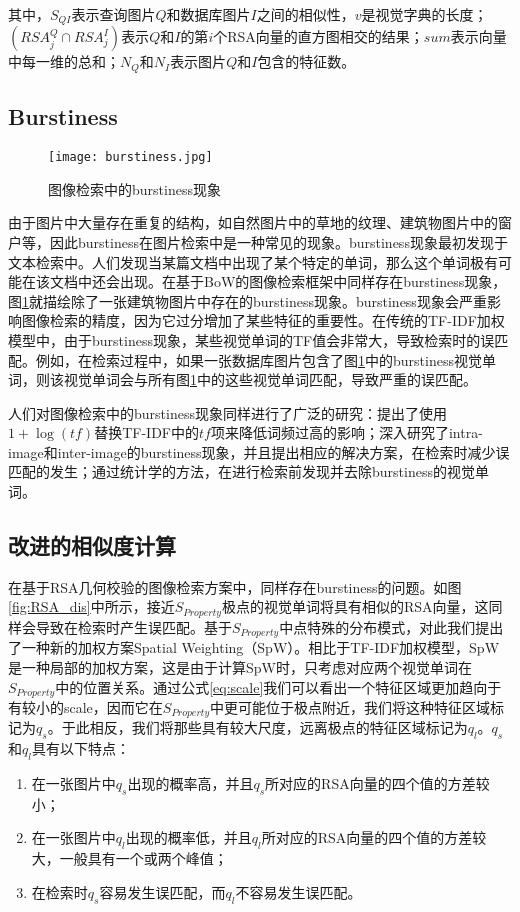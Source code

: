 其中，$S_{QI}$表示查询图片$Q$和数据库图片$I$之间的相似性，$v$是视觉字典的长度；$(RSA_j^Q \cap RSA_j^I)$表示$Q$和$I$的第$i$个RSA向量的直方图相交的结果；$sum$表示向量中每一维的总和；$N_Q$和$N_I$表示图片$Q$和$I$包含的特征数。

\subsection{Burstiness}
\begin{figure}[h]
	\centering
	\texttt{[image: burstiness.jpg]}
	\caption{图像检索中的burstiness现象}\label{fig:burst}
\end{figure}

由于图片中大量存在重复的结构，如自然图片中的草地的纹理、建筑物图片中的窗户等，因此burstiness\cite{jegou2009burstiness}在图片检索中是一种常见的现象。burstiness现象最初发现于文本检索中。人们发现当某篇文档中出现了某个特定的单词，那么这个单词极有可能在该文档中还会出现。在基于BoW的图像检索框架中同样存在burstiness现象，图\ref{fig:burst}就描绘除了一张建筑物图片中存在的burstiness现象。burstiness现象会严重影响图像检索的精度，因为它过分增加了某些特征的重要性。在传统的TF-IDF加权模型中，由于burstiness现象，某些视觉单词的TF值会非常大，导致检索时的误匹配。例如，在检索过程中，如果一张数据库图片包含了图\ref{fig:burst}中的burstiness视觉单词，则该视觉单词会与所有图\ref{fig:burst}中的这些视觉单词匹配，导致严重的误匹配。

人们对图像检索中的burstiness现象同样进行了广泛的研究：\cite{Zhong2015Fast}提出了使用$1+\log (tf)$替换TF-IDF中的$tf$项来降低词频过高的影响；\cite{jegou2008hamming}深入研究了intra-image和inter-image的burstiness现象，并且提出相应的解决方案，在检索时减少误匹配的发生；\cite{shi2015early}通过统计学的方法，在进行检索前发现并去除burstiness的视觉单词。

\subsection{改进的相似度计算}
在基于RSA几何校验的图像检索方案中，同样存在burstiness的问题。如图\ref{fig:RSA_dis}中所示，接近$S_{Property}$极点的视觉单词将具有相似的RSA向量，这同样会导致在检索时产生误匹配。基于$S_{Property}$中点特殊的分布模式，对此我们提出了一种新的加权方案Spatial Weighting（SpW）。相比于TF-IDF加权模型，SpW是一种局部的加权方案，这是由于计算SpW时，只考虑对应两个视觉单词在$S_{Property}$中的位置关系。通过公式\ref{eq:scale}我们可以看出一个特征区域更加趋向于有较小的scale，因而它在$S_{Property}$中更可能位于极点附近，我们将这种特征区域标记为$q_s$。于此相反，我们将那些具有较大尺度，远离极点的特征区域标记为$q_l$。$q_s$和$q_l$具有以下特点：
\begin{enumerate}
	\item 在一张图片中$q_s$出现的概率高，并且$q_s$所对应的RSA向量的四个值的方差较小；
	\item 在一张图片中$q_l$出现的概率低，并且$q_l$所对应的RSA向量的四个值的方差较大，一般具有一个或两个峰值；
	\item 在检索时$q_s$容易发生误匹配，而$q_l$不容易发生误匹配。
\end{enumerate}

